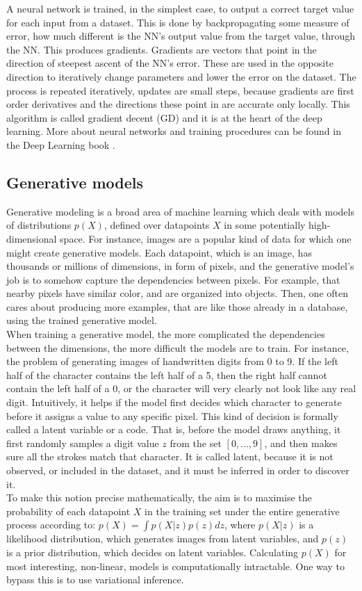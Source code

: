 A neural network is trained, in the simplest case, to output a correct target value for each input from a dataset. This is done by backpropagating some measure of error, how much different is the NN's output value from the target value, through the NN. This produces gradients. Gradients are vectors that point in the direction of steepest ascent of the NN's error. These are used in the opposite direction to iteratively change parameters and lower the error on the dataset. The process is repeated iteratively, updates are small steps, because gradients are first order derivatives and the directions these point in are accurate only locally. This algorithm is called gradient decent (GD) and it is at the heart of the deep learning. More about neural networks and training procedures can be found in the Deep Learning book \cite{Book.DeepLearning}.

\subsection{Generative models} \label{Sec.ModelLearning}

Generative modeling is a broad area of machine learning which deals with models of distributions $p(X)$, defined over datapoints $X$ in some potentially high-dimensional space. For instance, images are a popular kind of data for which one might create generative models. Each datapoint, which is an image, has thousands or millions of dimensions, in form of pixels, and the generative model’s job is to somehow capture the dependencies between pixels. For example, that nearby pixels have similar color, and are organized into objects. Then, one often cares about producing more examples, that are like those already in a database, using the trained generative model. \\
When training a generative model, the more complicated the dependencies between the dimensions, the more difficult the models are to train. For instance, the problem of generating images of handwritten digits from 0 to 9. If the left half of the character contains the left half of a 5, then the right half cannot contain the left half of a 0, or the character will very clearly not look like any real digit. Intuitively, it helps if the model first decides which character to generate before it assigns a value to any specific pixel. This kind of decision is formally called a latent variable or a code. That is, before the model draws anything, it first randomly samples a digit value $z$ from the set $[0, ..., 9]$, and then makes sure all the strokes match that character. It is called latent, because it is not observed, or included in the dataset, and it must be inferred in order to discover it. \\
To make this notion precise mathematically, the aim is to maximise the probability of each datapoint $X$ in the training set under the entire generative process according to: $p(X) = \int p(X|z)p(z)dz$, where $p(X|z)$ is a likelihood distribution, which generates images from latent variables, and $p(z)$ is a prior distribution, which decides on latent variables. Calculating $p(X)$ for most interesting, non-linear, models is computationally intractable. One way to bypass this is to use variational inference.

